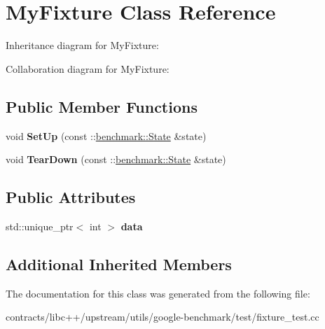 \hypertarget{class_my_fixture}{}\section{My\+Fixture Class Reference}
\label{class_my_fixture}


Inheritance diagram for My\+Fixture\+:


Collaboration diagram for My\+Fixture\+:
\subsection*{Public Member Functions}
\begin{DoxyCompactItemize}
\item 
\mbox{\label{class_my_fixture_ae63fe65b9cf8b689791442f2fe4afaf4}} 
void {\bfseries Set\+Up} (const \+::\mbox{\hyperlink{classbenchmark_1_1_state}{benchmark\+::\+State}} \&state)
\item 
\mbox{\label{class_my_fixture_a10c4845040c4516db3e3cf11c757868b}} 
void {\bfseries Tear\+Down} (const \+::\mbox{\hyperlink{classbenchmark_1_1_state}{benchmark\+::\+State}} \&state)
\end{DoxyCompactItemize}
\subsection*{Public Attributes}
\begin{DoxyCompactItemize}
\item 
\mbox{\label{class_my_fixture_a107acf60feed9322da436d0cde35894d}} 
std\+::unique\+\_\+ptr$<$ int $>$ {\bfseries data}
\end{DoxyCompactItemize}
\subsection*{Additional Inherited Members}


The documentation for this class was generated from the following file\+:\begin{DoxyCompactItemize}
\item 
contracts/libc++/upstream/utils/google-\/benchmark/test/fixture\+\_\+test.\+cc\end{DoxyCompactItemize}
